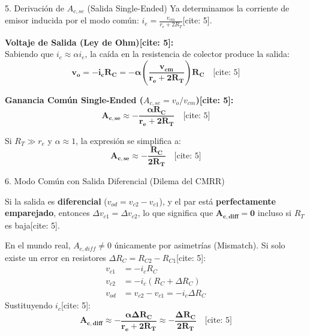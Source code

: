 \documentclass[aspectratio=169]{beamer}
\begin{document}
\begin{frame}{5. Derivación de $A_{c,se}$ (Salida Single-Ended)}
    Ya determinamos la corriente de emisor inducida por el modo común: $i_e = \frac{v_{cm}}{r_e + 2R_T}$[cite: 5].
    
    \vspace{0.3cm}
    \textbf{Voltaje de Salida (Ley de Ohm)[cite: 5]:} \\
    Sabiendo que $i_c \approx \alpha i_e$, la caída en la resistencia de colector produce la salida:
    \begin{equation*}
        \bm{v_o = -i_c R_C = -\alpha \left(\frac{v_{cm}}{r_e + 2R_T}\right) R_C} \quad \text{[cite: 5]}
    \end{equation*}
    
    \vspace{0.3cm}
    \textbf{Ganancia Común Single-Ended ($A_{c,se} = v_o / v_{cm}$)[cite: 5]:}
    \begin{equation*}
        \bm{A_{c,se} \approx -\frac{\alpha R_C}{r_e + 2R_T}} \quad \text{[cite: 5]}
    \end{equation*}
    
    Si $R_T \gg r_e$ y $\alpha \approx 1$, la expresión se simplifica a:
    \begin{equation*}
        \bm{A_{c,se} \approx -\frac{R_C}{2 R_T}} \quad \text{[cite: 5]}
    \end{equation*}
\end{frame}

\begin{frame}{6. Modo Común con Salida Diferencial (Dilema del CMRR)}
    \begin{tcolorbox}[colback=red!5, colframe=red!70!black, title=\textbf{Advertencia: Mismatch y Convención Oficial[cite: 5]}]
        Si la salida es \textbf{diferencial} ($v_{od} = v_{c2} - v_{c1}$), y el par está \textbf{perfectamente emparejado}, entonces $\Delta v_{c1} = \Delta v_{c2}$, lo que significa que $\mathbf{A_{c,diff} = 0}$ incluso si $R_T$ es baja[cite: 5].
    \end{tcolorbox}
    
    En el mundo real, $A_{c,diff} \neq 0$ únicamente por asimetrías (Mismatch). Si solo existe un error en resistores $\Delta R_C = R_{C2} - R_{C1}$[cite: 5]:
    \begin{align*}
        v_{c1} &= -i_c R_C \\
        v_{c2} &= -i_c (R_C + \Delta R_C) \\
        v_{od} &= v_{c2} - v_{c1} = -i_c \Delta R_C
    \end{align*}
    Sustituyendo $i_c$[cite: 5]:
    \begin{equation*}
        \bm{A_{c,diff} \approx -\frac{\alpha \Delta R_C}{r_e + 2R_T} \approx -\frac{\Delta R_C}{2 R_T}} \quad \text{[cite: 5]}
    \end{equation*}
\end{frame}
\end{document}
